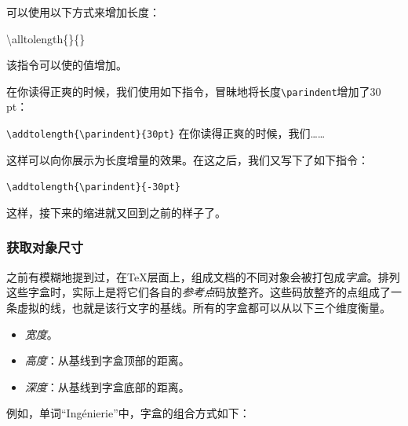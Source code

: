 可以使用以下方式来增加长度：

\begin{dmd}
\backslash alltolength\{\}\{\}
\end{dmd}

该指令可以使的值增加。

\addtolength{\parindent}{30pt} 在你读得正爽的时候，我们使用如下指令，冒昧地将长度\verb|\parindent|增加了30 pt：

\begin{dmd}
\verb+\addtolength{\parindent}{30pt}+ 在你读得正爽的时候，我们……
\end{dmd}

\addtolength{\parindent}{-30pt}
这样可以向你展示为长度增量的效果。在这之后，我们又写下了如下指令：

\begin{dmd}
\verb|\addtolength{\parindent}{-30pt}|
\end{dmd}

这样，接下来的缩进就又回到之前的样子了。

\subsubsection{获取对象尺寸}

之前有模糊地提到过，在\TeX 层面上，组成文档的不同对象会被打包成\emph{字盒}。排列这些字盒时，实际上是将它们各自的\emph{参考点}码放整齐。这些码放整齐的点组成了一条虚拟的线，也就是该行文字的基线。所有的字盒都可以从以下三个维度衡量。

\begin{itemize}
  \item \emph{宽度}。
  \item \emph{高度}：从基线到字盒顶部的距离。
  \item \emph{深度}：从基线到字盒底部的距离。
\end{itemize}

例如，单词“Ingénierie”中，字盒的组合方式如下：

\newsavebox{\boitecar}
\newlength{\interletter}
\newcommand{\refpoint}{\raisebox{-0.5\height}{\small$\circ$}}

\newcommand{\letterbox}[1]{%
   \setlength{\fboxsep}{0pt}%
   \setlength{\fboxrule}{0.2pt}%
   \sbox{\boitecar}{\framebox{\Huge#1}}%
   \settowidth{\letterwidth}{\usebox{\boitecar}}%
   \settowidth{\interletter}{\Huge#1}%
   \makebox[0pt]{\refpoint}%
   \usebox{\boitecar}%
   \kern-\fboxrule%
}

